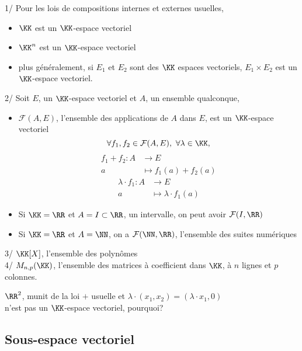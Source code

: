 \documentclass[../main.tex]{subfile}
\begin{document}
\begin{ex}
$\phantom{a}$\\
	1/ Pour les lois de compositions internes et externes usuelles, 
\begin{itemize}
	\item $\KK$ est un $\KK$-espace vectoriel
	\item $\KK^n$ est un $\KK$-espace vectoriel 
	\item plus généralement, si $E_1$ et $E_2$ sont des $\KK$ espaces vectoriels, $E_1 \times E_2$ est un $\KK$-espace vectoriel.
\end{itemize}
	2/ Soit $E$, un $\KK$-espace vectoriel et $A$, un ensemble qualconque, 
\begin{itemize}
	\item $\mathcal{F}(A, E)$, l'ensemble des applications de $A$ dans $E$, est un $\KK$-espace vectoriel
		$$
		\forall f_1, f_2 \in \mathcal{F}(A, E), \ \forall \lambda \in \KK,
		$$
		$$
		\begin{aligned}
			f_1 + f_2 : A &\to E\\
			a &\mapsto f_1(a) + f_2(a)
		\end{aligned}
		$$
		$$
		\begin{aligned}
			\lambda \cdot f_1 : A &\to E\\
			a &\mapsto \lambda \cdot f_1(a) 
		\end{aligned}
		$$
	\item Si $\KK = \RR$ et $A = I \subset \RR$, un intervalle, on peut avoir $\mathcal{F}(I, \RR)$
	\item Si $\KK = \RR$ et $A = \NN$, on a $\mathcal{F}(\NN, \RR)$, l'ensemble des suites numériques
\end{itemize}
	3/ $\KK[X]$, l'ensemble des polynômes\\
	4/ $M_{n,p}(\KK)$, l'ensemble des matrices à coefficient dans $\KK$, à $n$ lignes et $p$ colonnes.
\end{ex}

\begin{rema}
	$\RR^2$, munit de la loi $+$ usuelle et $\lambda \cdot (x_1, x_2) = (\lambda \cdot x_1, 0)$\\
	n'est pas un $\KK$-espace vectoriel, pourquoi?
\end{rema}

\subsection{Sous-espace vectoriel}
\end{document}
